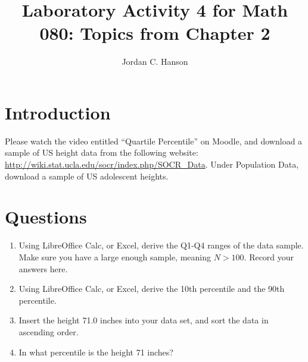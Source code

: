\documentclass{article}
\begin{document}
\title{Laboratory Activity 4 for Math 080: Topics from Chapter 2}
\author{Jordan C. Hanson}
\maketitle

\section{Introduction}

Please watch the video entitled ``Quartile Percentile'' on Moodle, and download a sample of US height data from the following website: \url{http://wiki.stat.ucla.edu/socr/index.php/SOCR_Data}.  Under Population Data, download a sample of US adolescent heights.

\section{Questions}

\begin{enumerate}
\item Using LibreOffice Calc, or Excel, derive the Q1-Q4 ranges of the data sample.  Make sure you have a large enough sample, meaning $N>100$. Record your answers here. \\ \vspace{2cm}
\item Using LibreOffice Calc, or Excel, derive the 10th percentile and the 90th percentile. \\ \vspace{2cm}
\item Insert the height 71.0 inches into your data set, and sort the data in ascending order.
\item In what percentile is the height 71 inches?
\end{enumerate}
\end{document}

